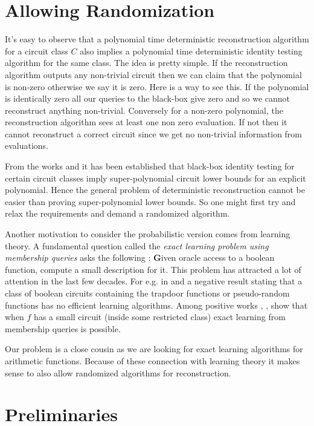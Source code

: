 \documentclass[12pt]{caltech_thesis}
\theoremstyle{plain}
\theoremstyle{definition}
\renewcommand{\bf}{\textbf}
\begin{document}
\section{Allowing Randomization}
It's easy to observe that a polynomial time
deterministic reconstruction algorithm for a circuit class $C$ also implies a
polynomial time deterministic identity testing algorithm for the same class. The idea is pretty simple. If the reconstruction
algorithm outputs any non-trivial circuit then we can claim that the polynomial is non-zero otherwise we say it is zero. Here is a way to see this.
If the polynomial is identically zero all our queries to the black-box give zero and so we cannot reconstruct anything non-trivial.
Conversely for a non-zero polynomial, the reconstruction algorithm sees at least one non zero evaluation. If not
then it cannot reconstruct a correct circuit since we get no non-trivial information from evaluations.

From the works
\cite{Agr05} and \cite{HS80} it has been established that black-box identity testing for certain circuit
classes imply super-polynomial circuit lower bounds for an
explicit polynomial. Hence the general problem of deterministic reconstruction
cannot be easier than proving
super-polynomial lower bounds. So one might first try and relax the requirements and demand a
randomized algorithm. 

Another motivation to consider the probabilistic version comes from learning theory.
A fundamental question called the \emph{exact learning problem using membership queries} asks
the following : {\bf Given oracle access to a boolean
function, compute a small description for it.}
This problem has attracted a lot
of attention in the last few decades. For e.g. in \cite{Khar92}\cite{OGM86} and \cite{KV94} a negative
result stating that a class of boolean
circuits containing the trapdoor functions or pseudo-random functions has no
efficient learning algorithms. Among positive works \cite{SchSe96}, \cite{BBB00}, \cite{KS06}
show that when $f$ has a small circuit (inside some restricted class) exact
learning from
membership queries is possible.   

Our problem
is a close cousin as we are looking for exact learning algorithms for arithmetic
functions. Because of these connection with learning theory it makes sense to
also allow randomized algorithms for reconstruction.


\section{Preliminaries}
\end{document}

